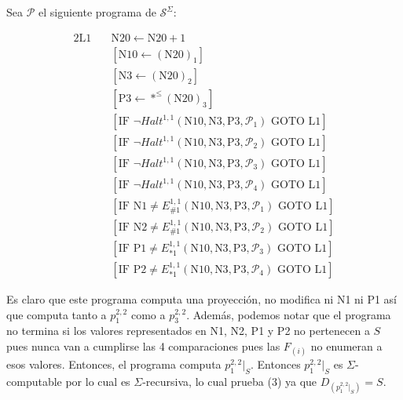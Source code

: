 \documentclass{article}
\begin{document}
\bigskip

Sea \( \mathcal{P} \) el siguiente programa de \( \mathcal{S}^\Sigma \):

\begin{alignat*}{2}
\text{L1} \quad & \text{N20} \leftarrow \text{N20} + 1 \\
& [\text{N10} \leftarrow (\text{N20})_1] \\
& [\text{N3} \leftarrow (\text{N20})_2] \\
& [\text{P3} \leftarrow *^{\leq}(\text{N20})_3] \\
& [\text{IF } \neg Halt^{1,1}(\text{N10}, \text{N3}, \text{P3}, \mathcal{P}_1) \text{ GOTO L1}] \\
& [\text{IF } \neg Halt^{1,1}(\text{N10}, \text{N3}, \text{P3}, \mathcal{P}_2) \text{ GOTO L1}] \\
& [\text{IF } \neg Halt^{1,1}(\text{N10}, \text{N3}, \text{P3}, \mathcal{P}_3) \text{ GOTO L1}] \\
& [\text{IF } \neg Halt^{1,1}(\text{N10}, \text{N3}, \text{P3}, \mathcal{P}_4) \text{ GOTO L1}] \\
& [\text{IF N1} \neq E^{1,1}_{\#1}(\text{N10}, \text{N3}, \text{P3}, \mathcal{P}_1) \text{ GOTO L1}] \\
& [\text{IF N2} \neq E^{1,1}_{\#1}(\text{N10}, \text{N3}, \text{P3}, \mathcal{P}_2) \text{ GOTO L1}] \\
& [\text{IF P1} \neq E^{1,1}_{\ast1}(\text{N10}, \text{N3}, \text{P3}, \mathcal{P}_3) \text{ GOTO L1}] \\
& [\text{IF P2} \neq E^{1,1}_{\ast1}(\text{N10}, \text{N3}, \text{P3}, \mathcal{P}_4) \text{ GOTO L1}]
\end{alignat*}


Es claro que este programa computa una proyección, no modifica ni N1 ni P1 así que computa tanto a $p_1^{2,2}$ como a $p_3^{2,2}$. Además, podemos notar que el programa no termina si los valores representados en N1, N2, P1 y P2 no pertenecen a $S$ pues nunca van a cumplirse las 4 comparaciones pues las $F_{(i)}$ no enumeran a esos valores. Entonces, el programa computa $p_1^{2,2}|_S$. Entonces \( p^{2,2}_1|_S \) es \( \Sigma \)-computable por lo cual es \( \Sigma \)-recursiva, lo cual prueba (3) ya que \( D_{(p^{2,2}_1|_S)} = S \).
 
\end{document}

